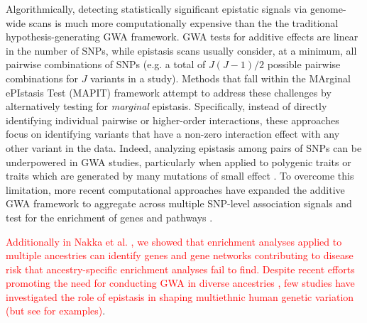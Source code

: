\documentclass[10pt]{article}
\begin{document}
Algorithmically, detecting statistically significant epistatic signals via genome-wide scans is much more computationally expensive than the the traditional hypothesis-generating GWA framework. GWA tests for additive effects are linear in the number of SNPs, while epistasis scans usually consider, at a minimum, all pairwise combinations of SNPs (e.g. a total of $J(J - 1)/2$ possible pairwise combinations for $J$ variants in a study). Methods that fall within the MArginal ePIstasis Test (MAPIT) framework \cite{Crawford2017a,Crawford2018b,Moore2019,Wang2019} attempt to address these challenges by alternatively testing for \textit{marginal} epistasis. Specifically, instead of directly identifying individual pairwise or higher-order interactions, these approaches focus on identifying variants that have a non-zero interaction effect with any other variant in the data. Indeed, analyzing epistasis among pairs of SNPs can be underpowered in GWA studies, particularly when applied to polygenic traits or traits which are generated by many mutations of small effect \cite{Zhou2013,Yang2014,Bulik-Sullivan2015,Wray2018}. To overcome this limitation, more recent computational approaches have expanded the additive GWA framework to aggregate across multiple SNP-level association signals and test for the enrichment of genes and pathways \cite{Subramanian2005,Cantor2010,Wang2010b,Lee2012,Carbonetto2013,Mooney2014,Gamazon2015,de2016,Nakka2016,Zhu2018,Sun2019,Cheng2020}. 

\textcolor{red}{Additionally in Nakka et al. \cite{Nakka2017}, we showed that enrichment analyses applied to multiple ancestries can identify genes and gene networks contributing to disease risk that ancestry-specific enrichment analyses fail to find. Despite recent efforts promoting the need for conducting GWA in diverse ancestries \cite{Popejoy2016,Martin2018,Martin2019,Gurdasani2019,Sirugo2019,Wojcik2019}, few studies have investigated the role of epistasis in shaping multiethnic human genetic variation (but see \cite{Ma2012,Fish2016,Choquet2018,Hoffmann2018} for examples)}. 
\end{document}
